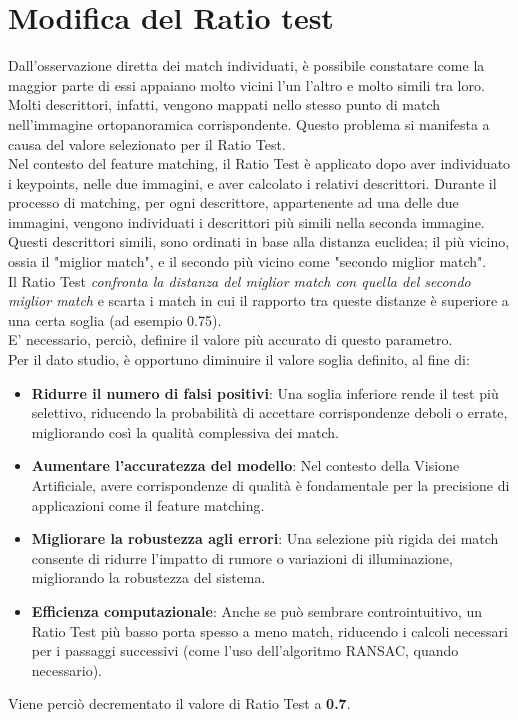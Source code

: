 \documentclass[12pt,a4paper,openright,twoside]{book}
\begin{document}
\section{Modifica del Ratio test}
Dall'osservazione diretta dei match individuati, è possibile constatare come la maggior parte di essi appaiano molto vicini l'un l'altro e molto simili tra loro. Molti descrittori, infatti, vengono mappati nello stesso punto di match nell'immagine ortopanoramica corrispondente. Questo problema si manifesta a causa del valore selezionato per il Ratio Test. \\
Nel contesto del feature matching, il Ratio Test è applicato dopo aver individuato i keypoints, nelle due immagini, e aver calcolato i relativi descrittori. Durante il processo di matching, per ogni descrittore, appartenente ad una delle due immagini,  vengono individuati i descrittori più simili nella seconda immagine.\\
Questi descrittori simili, sono ordinati in base alla distanza euclidea; il più vicino, ossia il "miglior match", e il secondo più vicino come "secondo miglior match".\\
Il Ratio Test {\itshape confronta la distanza del miglior match con quella del secondo miglior match} e scarta i match in cui il rapporto tra queste distanze è superiore a una certa soglia (ad esempio 0.75).\\
E' necessario, perciò, definire il valore più accurato di questo parametro.\\
Per il dato studio, è opportuno diminuire il valore soglia definito, al fine di:
\begin{itemize}
\item \textbf{Ridurre il numero di falsi positivi}: Una soglia inferiore rende il test più selettivo, riducendo la probabilità di accettare corrispondenze deboli o errate, migliorando così la qualità complessiva dei match.
\item \textbf{Aumentare l'accuratezza del modello}: Nel contesto della Visione Artificiale, avere corrispondenze di qualità è fondamentale per la precisione di applicazioni come il feature matching.
\item \textbf{Migliorare la robustezza agli errori}: Una selezione più rigida dei match consente di ridurre l’impatto di rumore o variazioni di illuminazione, migliorando la robustezza del sistema.
\item \textbf{Efficienza computazionale}: Anche se può sembrare controintuitivo, un Ratio Test più basso porta spesso a meno match, riducendo i calcoli necessari per i passaggi successivi (come l'uso dell'algoritmo RANSAC, quando necessario).
\end{itemize}
Viene perciò decrementato il valore di Ratio Test a \textbf{0.7}.\\
\end{document}

